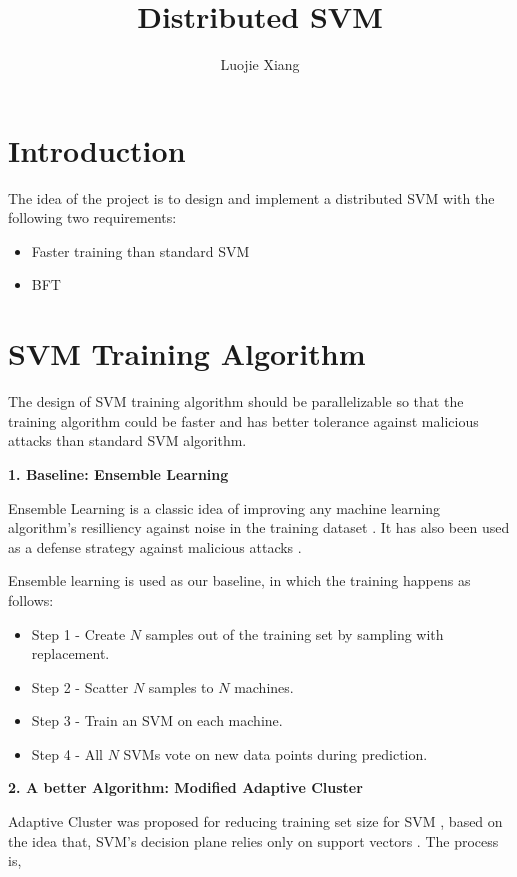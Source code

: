 \documentclass[10pt,conference,compsocconf,letterpaper]{IEEEtran}
\title{Distributed SVM}
\author{Luojie Xiang}
\date{}
\begin{document}
\maketitle{}
\section{Introduction}

The idea of the project is to design and implement a distributed SVM with the following two requirements:

\begin{itemize}
\item Faster training than standard SVM
\item BFT
\end{itemize}

\section{SVM Training Algorithm}

The design of SVM training algorithm should be parallelizable so that the training algorithm could be faster and has better tolerance against malicious attacks than standard SVM algorithm.

\textbf{1. Baseline: Ensemble Learning}

Ensemble Learning is a classic idea of improving any machine learning algorithm's resilliency against noise in the training dataset \cite{leo96, dong05}. It has also been used as a defense strategy against malicious attacks \cite{marco08, gabriela08}. 

Ensemble learning is used as our baseline, in which the training happens as follows:

\begin{itemize}
\item Step 1 - Create $N$ samples out of the training set by sampling with replacement.
\item Step 2 - Scatter $N$ samples to $N$ machines.
\item Step 3 - Train an SVM on each machine.
\item Step 4 - All $N$ SVMs vote on new data points during prediction.
\end{itemize}

\textbf{2. A better Algorithm: Modified Adaptive Cluster}

Adaptive Cluster was proposed for reducing training set size for SVM \cite{boley04, hwanjo03}, based on the idea that, SVM's decision plane relies only on support vectors \cite{koggalage04}. The process is, 
\end{document}
